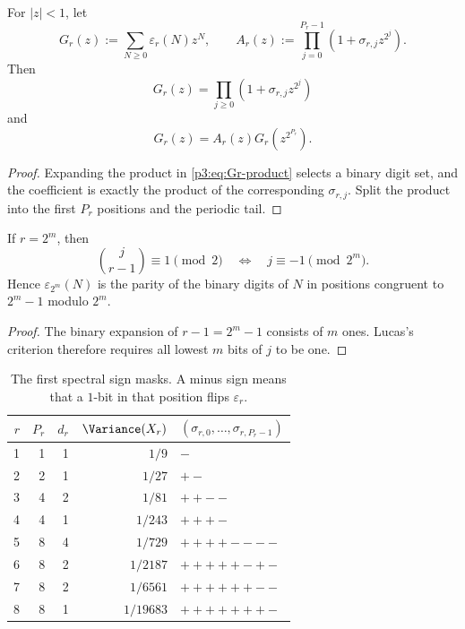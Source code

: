 \documentclass[11pt,oneside]{article}
\theoremstyle{definition}
\theoremstyle{remark}
\begin{document}
\begin{corollary}\label{p3:cor:mahler-r}
For $|z|<1$, let
\begin{equation}\label{p3:eq:Gr}
 G_r(z):=\sum_{N\ge0}\varepsilon_r(N)z^N,
 \qquad
 A_r(z):=\prod_{j=0}^{P_r-1}(1+\sigma_{r,j}z^{2^j}).
\end{equation}
Then
\begin{equation}\label{p3:eq:Gr-product}
 G_r(z)=\prod_{j\ge0}(1+\sigma_{r,j}z^{2^j})
\end{equation}
and
\begin{equation}\label{p3:eq:mahler-r}
  G_r(z)=A_r(z)G_r\!\left(z^{2^{P_r}}\right).
\end{equation}
\end{corollary}

\begin{proof}
Expanding the product in \eqref{p3:eq:Gr-product} selects a binary digit set, and the coefficient is exactly the product of the corresponding $\sigma_{r,j}$.  Split the product into the first $P_r$ positions and the periodic tail.
\end{proof}

\begin{corollary}\label{p3:cor:power-two-rank}
If $r=2^m$, then
\begin{equation}\label{p3:eq:power-two-position}
 \binom j{r-1}\equiv1\pmod2
 \quad\Longleftrightarrow\quad
 j\equiv-1\pmod{2^m}.
\end{equation}
Hence $\varepsilon_{2^m}(N)$ is the parity of the binary digits of $N$ in positions congruent to $2^m-1$ modulo $2^m$.
\end{corollary}

\begin{proof}
The binary expansion of $r-1=2^m-1$ consists of $m$ ones.  Lucas's criterion therefore requires all lowest $m$ bits of $j$ to be one.
\end{proof}

\begin{table}[ht]
\centering
\caption{The first spectral sign masks.  A minus sign means that a $1$-bit in that position flips $\varepsilon_r$.}
\label{p3:tab:sign-masks}
\begin{tabular}{@{}rrrrl@{}}
\toprule
$r$ & $P_r$ & $d_r$ & $\Variance(X_r)$ & $(\sigma_{r,0},\ldots,\sigma_{r,P_r-1})$\\
\midrule
1 & 1 & 1 & $1/9$     & $-$\\
2 & 2 & 1 & $1/27$    & $+-$\\
3 & 4 & 2 & $1/81$    & $++--$\\
4 & 4 & 1 & $1/243$   & $+++- $\\
5 & 8 & 4 & $1/729$   & $++++----$\\
6 & 8 & 2 & $1/2187$  & $+++++-+-$\\
7 & 8 & 2 & $1/6561$  & $++++++--$\\
8 & 8 & 1 & $1/19683$ & $+++++++- $\\
\bottomrule
\end{tabular}
\end{table}
\end{document}
